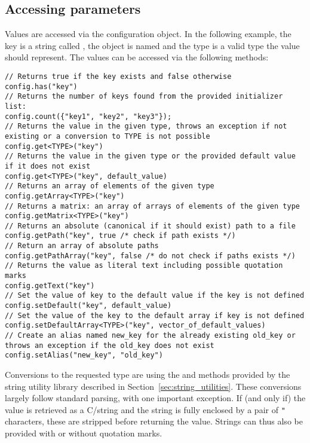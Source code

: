 \subsection{Accessing parameters}
\label{sec:accessing_parameters}
Values are accessed via the configuration object.
In the following example, the key is a string called , the object is named  and the type  is a valid \CPP type the value should represent.
The values can be accessed via the following methods:
\begin{verbatim}
// Returns true if the key exists and false otherwise
config.has("key")
// Returns the number of keys found from the provided initializer list:
config.count({"key1", "key2", "key3"});
// Returns the value in the given type, throws an exception if not existing or a conversion to TYPE is not possible
config.get<TYPE>("key")
// Returns the value in the given type or the provided default value if it does not exist
config.get<TYPE>("key", default_value)
// Returns an array of elements of the given type
config.getArray<TYPE>("key")
// Returns a matrix: an array of arrays of elements of the given type
config.getMatrix<TYPE>("key")
// Returns an absolute (canonical if it should exist) path to a file
config.getPath("key", true /* check if path exists */)
// Return an array of absolute paths
config.getPathArray("key", false /* do not check if paths exists */)
// Returns the value as literal text including possible quotation marks
config.getText("key")
// Set the value of key to the default value if the key is not defined
config.setDefault("key", default_value)
// Set the value of the key to the default array if key is not defined
config.setDefaultArray<TYPE>("key", vector_of_default_values)
// Create an alias named new_key for the already existing old_key or throws an exception if the old_key does not exist
config.setAlias("new_key", "old_key")
\end{verbatim}

Conversions to the requested type are using the  and  methods provided by the string utility library described in Section~\ref{sec:string_utilities}.
These conversions largely follow standard \CPP parsing, with one important exception.
If (and only if) the value is retrieved as a C/\CPP string and the string is fully enclosed by a pair of \texttt{"} characters, these are stripped before returning the value.
Strings can thus also be provided with or without quotation marks.

